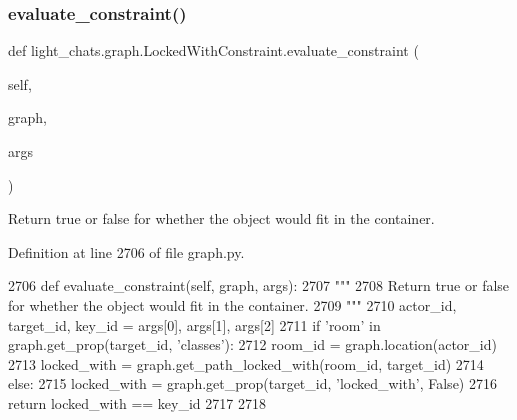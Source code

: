 \subsubsection{\texorpdfstring{evaluate\+\_\+constraint()}{evaluate\_constraint()}}
{\footnotesize\ttfamily def light\+\_\+chats.\+graph.\+Locked\+With\+Constraint.\+evaluate\+\_\+constraint (\begin{DoxyParamCaption}\item[{}]{self,  }\item[{}]{graph,  }\item[{}]{args }\end{DoxyParamCaption})}

\begin{DoxyVerb}Return true or false for whether the object would fit in the container.
\end{DoxyVerb}
 

Definition at line 2706 of file graph.\+py.


\begin{DoxyCode}
2706     \textcolor{keyword}{def }evaluate\_constraint(self, graph, args):
2707         \textcolor{stringliteral}{"""}
2708 \textcolor{stringliteral}{        Return true or false for whether the object would fit in the container.}
2709 \textcolor{stringliteral}{        """}
2710         actor\_id, target\_id, key\_id = args[0], args[1], args[2]
2711         \textcolor{keywordflow}{if} \textcolor{stringliteral}{'room'} \textcolor{keywordflow}{in} graph.get\_prop(target\_id, \textcolor{stringliteral}{'classes'}):
2712             room\_id = graph.location(actor\_id)
2713             locked\_with = graph.get\_path\_locked\_with(room\_id, target\_id)
2714         \textcolor{keywordflow}{else}:
2715             locked\_with = graph.get\_prop(target\_id, \textcolor{stringliteral}{'locked\_with'}, \textcolor{keyword}{False})
2716         \textcolor{keywordflow}{return} locked\_with == key\_id
2717 
2718 
\end{DoxyCode}
\mbox{\label{classlight__chats_1_1graph_1_1LockedWithConstraint_af7d3c8160d19a1e5ec2ce62d11b54882}} 
